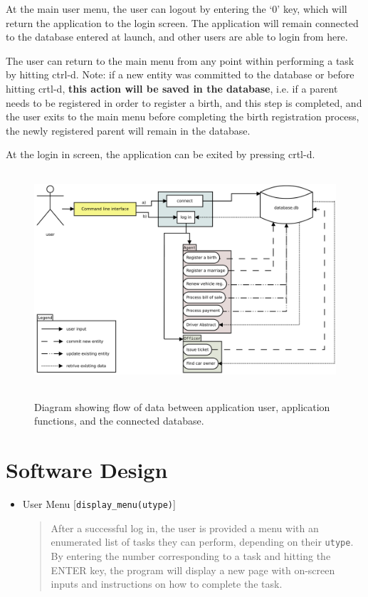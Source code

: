 \documentclass[10pt, a4paper]{article}
\begin{document}
{At the main user menu, the user can logout by entering the `0' key, which will return the application to the login screen. The application will remain connected to the database entered at launch, and other users are able to login from here.

The user can return to the main menu from any point within performing a task by hitting ctrl-d. Note: if a new entity was committed to the database or before hitting crtl-d, \textbf{this action will be saved in the database}, i.e. if a parent needs to be registered in order to register a birth, and this step is completed, and the user exits to the main menu before completing the birth registration process, the newly registered parent will remain in the database. 

At the login in screen, the application can be exited by pressing crtl-d.

\begin{figure}[H]
\centering
\includegraphics[height=8cm]{Diagram1.pdf}\label{fig}
\caption{Diagram showing flow of data between application user, application functions, and the connected database.}
\end{figure}

\section{Software Design}\label{SD}
\begin{itemize}

\item User Menu [\texttt{display\_menu(utype)}]
	\begin{quotation}
	\noindent After a successful log in, the user is provided a menu with an enumerated list of tasks they can perform, depending on their \texttt{utype}. By entering the number corresponding to a task and hitting the ENTER key, the program will display a new page with on-screen inputs and instructions on how to complete the task.
	\end{quotation}


\end{itemize}}
\end{document}
